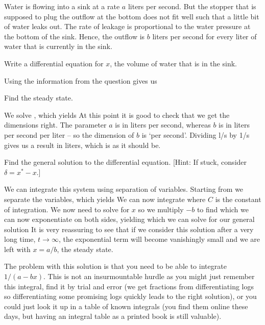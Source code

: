 Water is flowing into a sink at a rate $a$ liters per second. But the stopper that is supposed to plug the outflow at the bottom does not fit well such that a little bit of water leaks out. The rate of leakage is proportional to the water pressure at the bottom of the sink. Hence, the outflow is $b$ liters per second for every liter of water that is currently in the sink. 

\subquestion Write a differential equation for $x$, the volume of water that is in the sink. 

\solution
Using the information from the question gives us 

\subquestion Find the steady state.

\solution
We solve 
,
which yields 
At this point it is good to check that we get the dimensions right. The parameter $a$ is in liters per second, whereas $b$ is in liters per second per liter -- so the dimension of $b$ is `per second'. Dividing l/s by 1/s gives us a result in liters, which is as it should be.   

\subquestion Find the general solution to the differential equation. [Hint: If stuck, consider $\delta=x^*-x$.]

\solution
We can integrate this system using separation of variables. Starting from 
we separate the variables, which yields 
We can now integrate
where $C$ is the constant of integration. We now need to solve for $x$ so we multiply $-b$ to find
which we can now exponentiate on both sides, yielding
which we can solve for our general solution
It is very reassuring to see that if we consider this solution after a very long time, $t\to \infty$, the exponential term will become vanishingly small and we are left with $x=a/b$, the steady state. 

The problem with this solution is that you need to be able to integrate $1/(a-bx)$. This is not an insurmountable hurdle as you might just remember this integral, find it by trial and error (we get fractions from differentiating logs so differentiating some promising logs quickly leads to the right solution), or you could just look it up in a table of known integrals (you find them online these days, but having an integral table as a printed book is still valuable). 

